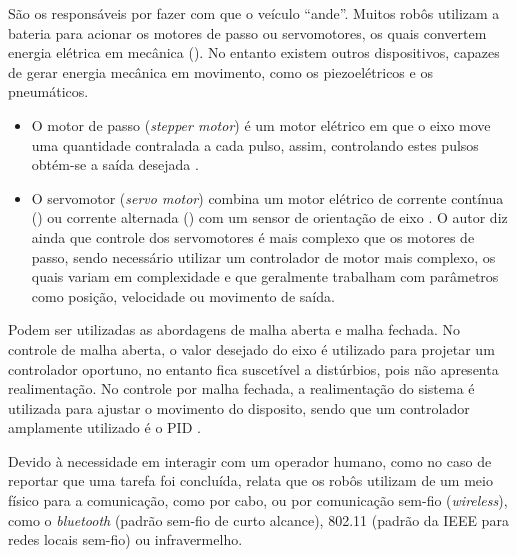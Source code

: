 São os responsáveis por fazer com que o veículo \textquotedblleft ande\textquotedblright. 
Muitos robôs utilizam a bateria para acionar os motores de passo ou servomotores, os quais convertem energia 
elétrica em mecânica (). No entanto existem outros dispositivos, capazes de gerar energia mecânica em movimento, 
como os piezoelétricos e os pneumáticos.\par
\begin{itemize}
 \item O motor de passo (\textit{stepper motor}) é um motor elétrico em que o eixo move uma quantidade contralada a cada pulso, assim, 
controlando estes pulsos obtém-se a saída desejada \cite{dudek_mobile}.\par
 \item O servomotor (\textit{servo motor}) combina um motor elétrico de corrente contínua 
() ou corrente alternada () com um sensor de orientação de eixo 
\cite{dudek_mobile}. 
O autor diz ainda que controle dos servomotores é mais complexo que os motores de passo, sendo necessário utilizar um controlador de 
motor mais complexo, os quais variam em complexidade e que geralmente trabalham com parâmetros como posição, velocidade ou 
movimento de saída.
\end{itemize}




 Podem ser utilizadas as abordagens de malha aberta e malha fechada. No controle 
de malha aberta, o valor desejado do eixo é utilizado para projetar um controlador oportuno, no entanto fica 
suscetível a distúrbios, pois não apresenta realimentação. No controle por malha fechada, a realimentação do sistema é utilizada para 
ajustar o movimento do disposito, sendo que um controlador amplamente utilizado é o PID \cite{dudek_mobile}.

 Devido à necessidade em interagir com um operador humano, como no caso de reportar que 
uma tarefa foi concluída,  relata que os robôs utilizam de um meio físico para a comunicação, como por cabo, ou 
por comunicação sem-fio (\textit{wireless}), como o \textit{bluetooth} (padrão sem-fio de curto alcance), 802.11 (padrão da IEEE 
 para redes locais sem-fio) ou infravermelho.

